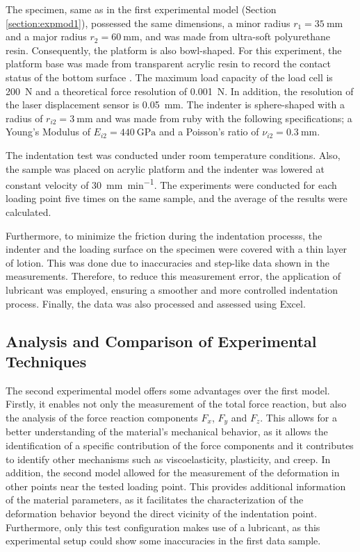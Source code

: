 The specimen, same as in the first experimental model (Section \ref{section:expmod1}),
 possessed the same dimensions, a minor radius $r_1 = \SI{35}{\milli \m}$ and a major 
 radius $r_2 = \SI{60}{\milli \m}$, and was
made from ultra-soft polyurethane resin. Consequently, the platform is also 
bowl-shaped. For this experiment, the platform base was made from transparent 
acrylic resin to record the contact status of the bottom surface \cite{Mori2022}. 
The maximum load capacity of the load cell is \SI{200}{\newton} and a theoretical 
force resolution of \SI{0.001}{\newton}. In addition, the resolution of the 
laser displacement sensor is \SI{0.05}{\milli \m}.
The indenter is sphere-shaped with a radius of $r_{i2} = \SI{3}{\milli \m}$ and
was made from ruby with the following specifications; 
a Young's Modulus of $E_{i2} = \SI{440}{\giga \pascal}$ and a Poisson's ratio of 
$\nu_{i2} = \SI{0.3}{\milli \m}$.

The indentation test was conducted under room temperature conditions. Also, 
the sample was placed on acrylic platform and the indenter was 
lowered at constant velocity of \SI[per-mode = symbol]{30}{\milli \m\per \minute}. 
The experiments were conducted for each loading point five times on the same sample, 
and the average of the results were calculated.

Furthermore, to minimize the friction during the indentation processs, the indenter 
and the loading surface on the specimen were covered with a thin layer of lotion. 
This was done due to inaccuracies and step-like data shown in the measurements. Therefore, to reduce 
this measurement error, the application of lubricant was employed, ensuring a 
smoother and more controlled indentation process. Finally, the data 
was also processed and assessed using Excel.

\subsection*{Analysis and Comparison of Experimental Techniques}

The second experimental model offers some advantages over the first model. 
Firstly, it enables not only the measurement of the total force reaction, but also the analysis 
of the force reaction components $F_x$, $F_y$ and $F_z$. This allows for a better 
understanding of the material's mechanical behavior, as it allows the identification 
of a specific contribution of the force components and it contributes to identify other 
mechanisms such as viscoelasticity, plasticity, and creep. 
In addition, the second model allowed for the measurement of the deformation in other 
points near the tested loading point. This provides additional information of the 
material parameters, as it facilitates the characterization of the deformation behavior beyond the 
direct vicinity of the indentation point. Furthermore, only this test configuration makes 
use of a lubricant, as this experimental setup could show some inaccuracies in the first data sample.


